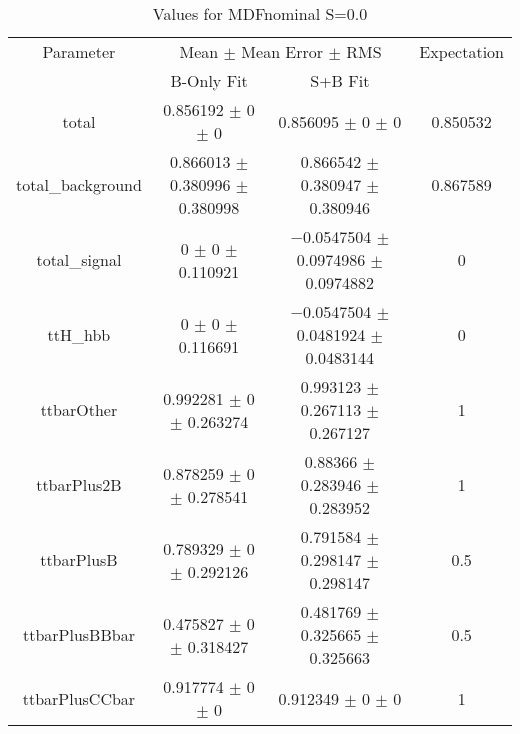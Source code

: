 \begin{table}
\centering
\caption{Values for MDFnominal S=0.0}
\begin{tabular}{cccc}
\toprule
Parameter & \multicolumn{2}{c}{Mean $\pm$ Mean Error $\pm$ RMS} & Expectation\\
 & B-Only Fit & S+B Fit & \\
\midrule
total & \num{0.856192} $\pm$ \num{0} $\pm$ \num{0} & \num{0.856095} $\pm$ \num{0} $\pm$ \num{0} & \num{0.850532}\\
total\_background & \num{0.866013} $\pm$ \num{0.380996} $\pm$ \num{0.380998} & \num{0.866542} $\pm$ \num{0.380947} $\pm$ \num{0.380946} & \num{0.867589}\\
total\_signal & \num{0} $\pm$ \num{0} $\pm$ \num{0.110921} & \num{-0.0547504} $\pm$ \num{0.0974986} $\pm$ \num{0.0974882} & \num{0}\\
ttH\_hbb & \num{0} $\pm$ \num{0} $\pm$ \num{0.116691} & \num{-0.0547504} $\pm$ \num{0.0481924} $\pm$ \num{0.0483144} & \num{0}\\
ttbarOther & \num{0.992281} $\pm$ \num{0} $\pm$ \num{0.263274} & \num{0.993123} $\pm$ \num{0.267113} $\pm$ \num{0.267127} & \num{1}\\
ttbarPlus2B & \num{0.878259} $\pm$ \num{0} $\pm$ \num{0.278541} & \num{0.88366} $\pm$ \num{0.283946} $\pm$ \num{0.283952} & \num{1}\\
ttbarPlusB & \num{0.789329} $\pm$ \num{0} $\pm$ \num{0.292126} & \num{0.791584} $\pm$ \num{0.298147} $\pm$ \num{0.298147} & \num{0.5}\\
ttbarPlusBBbar & \num{0.475827} $\pm$ \num{0} $\pm$ \num{0.318427} & \num{0.481769} $\pm$ \num{0.325665} $\pm$ \num{0.325663} & \num{0.5}\\
ttbarPlusCCbar & \num{0.917774} $\pm$ \num{0} $\pm$ \num{0} & \num{0.912349} $\pm$ \num{0} $\pm$ \num{0} & \num{1}\\
\bottomrule
\end{tabular}
\end{table}
